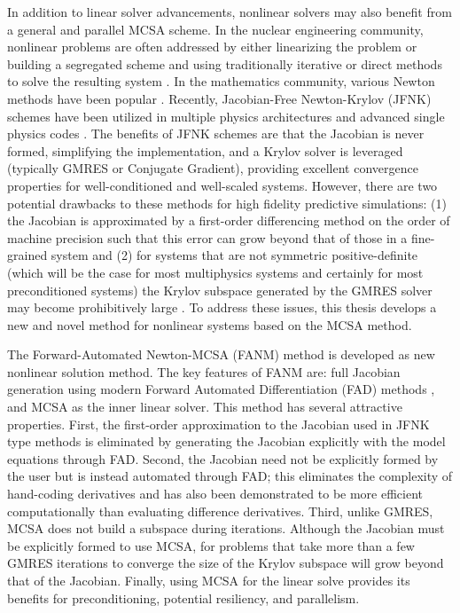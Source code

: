 In addition to linear solver advancements, nonlinear solvers may also
benefit from a general and parallel MCSA scheme. In the nuclear
engineering community, nonlinear problems are often addressed by
either linearizing the problem or building a segregated scheme and
using traditionally iterative or direct methods to solve the resulting
system \citep{pletcher_computational_1997}. In the mathematics
community, various Newton methods have been popular
\citep{kelley_iterative_1995}. Recently, Jacobian-Free Newton-Krylov
(JFNK) schemes \citep{knoll_jacobian-free_2004} have been utilized in
multiple physics architectures and advanced single physics codes
\citep{gaston_parallel_2009}. The benefits of JFNK schemes are that
the Jacobian is never formed, simplifying the implementation, and a
Krylov solver is leveraged (typically GMRES or Conjugate Gradient),
providing excellent convergence properties for well-conditioned and
well-scaled systems. However, there are two potential drawbacks to
these methods for high fidelity predictive simulations: (1) the
Jacobian is approximated by a first-order differencing method on the
order of machine precision such that this error can grow beyond that
of those in a fine-grained system \citep{kelley_iterative_1995} and
(2) for systems that are not symmetric positive-definite (which will
be the case for most multiphysics systems and certainly for most
preconditioned systems) the Krylov subspace generated by the GMRES
solver may become prohibitively large
\citep{knoll_newton-krylov_1995}. To address these issues, this thesis
develops a new and novel method for nonlinear systems based on the
MCSA method.

The Forward-Automated Newton-MCSA (FANM) method is developed as new
nonlinear solution method. The key features of FANM are: full Jacobian
generation using modern Forward Automated Differentiation (FAD)
methods \citep{bartlett_automatic_2006}, and MCSA as the inner linear
solver. This method has several attractive properties. First, the
first-order approximation to the Jacobian used in JFNK type methods is
eliminated by generating the Jacobian explicitly with the model
equations through FAD. Second, the Jacobian need not be explicitly
formed by the user but is instead automated through FAD; this
eliminates the complexity of hand-coding derivatives and has also been
demonstrated to be more efficient computationally than evaluating
difference derivatives. Third, unlike GMRES, MCSA does not build a
subspace during iterations. Although the Jacobian must be explicitly
formed to use MCSA, for problems that take more than a few GMRES
iterations to converge the size of the Krylov subspace will grow
beyond that of the Jacobian. Finally, using MCSA for the linear solve
provides its benefits for preconditioning, potential resiliency, and
parallelism.

